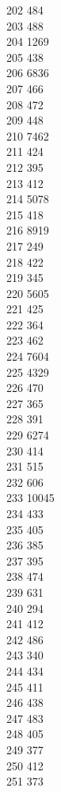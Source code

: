 { 202	484 \\
 203	488 \\
 204	1269 \\
 205	438 \\
 206	6836 \\
 207	466 \\
 208	472 \\
 209	448 \\
 210	7462 \\
 211	424 \\
 212	395 \\
 213	412 \\
 214	5078 \\
 215	418 \\
 216	8919 \\
 217	249 \\
 218	422 \\
 219	345 \\
 220	5605 \\
 221	425 \\
 222	364 \\
 223	462 \\
 224	7604 \\
 225	4329 \\
 226	470 \\
 227	365 \\
 228	391 \\
 229	6274 \\
 230	414 \\
 231	515 \\
 232	606 \\
 233	10045 \\
 234	433 \\
 235	405 \\
 236	385 \\
 237	395 \\
 238	474 \\
 239	631 \\
 240	294 \\
 241	412 \\
 242	486 \\
 243	340 \\
 244	434 \\
 245	411 \\
 246	438 \\
 247	483 \\
 248	405 \\
 249	377 \\
 250	412 \\
 251	373 \\
}
